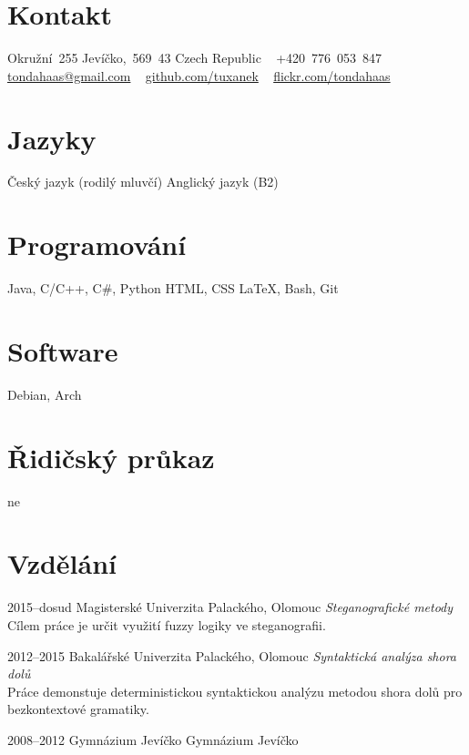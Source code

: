 \documentclass[]{friggeri-cv} %
\begin{document}


\begin{aside} %
\section{Kontakt}
Okružní~255
Jevíčko,~569~43
Czech Republic
~
+420~776~053~847
\href{mailto:tondahaas@gmail.com}{tondahaas@gmail.com}
~
\href{https://github.com/tuxanek}{github.com/tuxanek}
~
\href{https://flickr.com/tondahaas}{flickr.com/tondahaas}
\section{Jazyky}
Český jazyk (rodilý mluvčí)
Anglický jazyk (B2)
\section{Programování}
Java, C/C++, C\#, Python
HTML, CSS
LaTeX, Bash, Git
\section{Software}
Debian, Arch
\section{Řidičský průkaz}
ne
\end{aside}


\section{Vzdělání}

\begin{entrylist}

\entry
{2015--dosud}
{Magisterské}
{Univerzita Palackého, Olomouc}
{\emph{Steganografické metody} \\ Cílem práce je určit využití fuzzy logiky ve steganografii.}

\entry
{2012--2015}
{Bakalářské}
{Univerzita Palackého, Olomouc}
{\emph{Syntaktická analýza shora dolů} \\ Práce demonstuje deterministickou syntaktickou analýzu metodou shora dolů pro bezkontextové gramatiky.}

\entry
{2008--2012}
{{\normalfont Gymnázium Jevíčko}}
{Gymnázium Jevíčko}

\end{entrylist}
\end{document}
